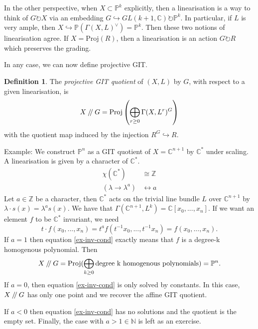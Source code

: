 \documentclass{article}
\theoremstyle{definition}
\newtheorem{definition}[theorem]{Definition}
\theoremstyle{remark}
\numberwithin{theorem}{section}
\newcommand{\C}{\mathbb{C}}
\newcommand{\bP}{\mathbb{P}}
\newcommand{\sslash}{\mathbin{/\mkern-4mu/}}
\newcommand{\Proj}{\text{Proj}}
\newenvironment{defn}{
	\begin{mdframed}
		\vspace{-0.5em}
		\begin{definition}
		}{
		\end{definition}
	\end{mdframed}
}
\begin{document}
	In the other perspective, when $X\subset \bP^k$ explicitly, then a linearisation is a way to think of $G\circlearrowright X$ via an embedding $G\hookrightarrow GL(k+1,\C) \circlearrowright\bP^k$. In particular, if $L$ is very ample, then $X\hookrightarrow \bP(\Gamma(X,L)^\vee) = \bP^k$. Then these two notions of linearisation agree. If $X = \Proj(R)$, then a linearisation is an action $G\circlearrowright R$ which preserves the grading. \vspace{1em}
	
	In any case, we can now define projective GIT.
	\begin{defn}
		The \emph{projective GIT quotient} of $(X,L)$ by $G$, with respect to a given linearisation, is 
		\begin{equation}
			X\sslash G = \Proj\left(\bigoplus_{r\geq 0} \Gamma(X,L^r)^G\right)
		\end{equation}
		with the quotient map induced by the injection $R^G\hookrightarrow R$.
	\end{defn}
	Example: We construct $\bP^n$ as a GIT quotient of $X=\C^{n+1}$ by $\C^\ast$ under scaling. A linearisation is given by a character of $\C^\ast$. 
	\begin{align*}
		\chi(\C^\ast) &\cong \mathbb{Z}\\
		(\lambda\to\lambda^a) &\leftrightarrow a
	\end{align*}
	Let $a\in \mathbb{Z}$ be a character, then $\C^\ast$ acts on the trivial line bundle $L$ over $\C^{n+1}$ by $\lambda \cdot s(x) = \lambda^a s(x)$. We have that $\Gamma(\C^{n+1}, L^k) = \C[x_0,...,x_n]$. If we want an element $f$ to be $\C^\ast$ invariant, we need
	\begin{equation}
		\label{ex-inv-cond}
		t\cdot f(x_0,...,x_n) = t^a f(t^{-1}x_0,...,t^{-1}x_n) = f(x_0,...,x_n).
	\end{equation}
	If $a=1$ then equation \ref{ex-inv-cond} exactly means that $f$ is a degree-k homogenous polynomial. Then 
	$$X\sslash G = \Proj(\bigoplus_{k\geq 0} \text{degree k homogenous polynomials}) = \bP^n.$$
	If $a=0$, then equation \ref{ex-inv-cond} is only solved by constants. In this case, $X\sslash G$ has only one point and we recover the affine GIT quotient. \vspace{1em}
	
	If $a<0$ then equation \ref{ex-inv-cond} has no solutions and the quotient is the empty set. Finally, the case with $a>1 \in \mathbb{N}$ is left as an exercise. \vspace{1em}
	
\end{document}

